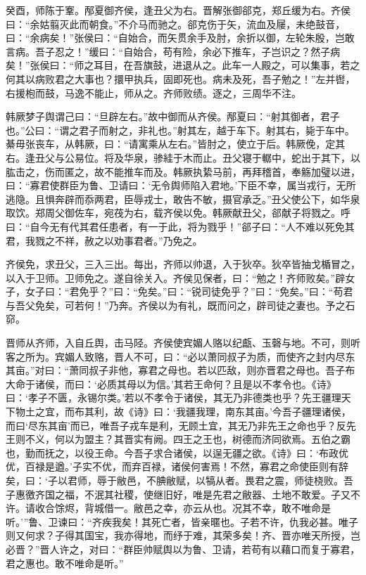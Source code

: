 \documentclass[a4paper,12pt,UTF8,twoside]{ctexbook}
\begin{document}
癸酉，师陈于鞌。邴夏御齐侯，逢丑父为右。晋解张御郤克，郑丘缓为右。齐侯曰：“余姑翦灭此而朝食。”不介马而驰之。郤克伤于矢，流血及屦，未绝鼓音，曰：“余病矣！”张侯曰：“自始合，而矢贯余手及肘，余折以御，左轮朱殷，岂敢言病。吾子忍之！”缓曰：“自始合，苟有险，余必下推车，子岂识之？然子病矣！”张侯曰：“师之耳目，在吾旗鼓，进退从之。此车一人殿之，可以集事，若之何其以病败君之大事也？擐甲执兵，固即死也。病未及死，吾子勉之！”左并辔，右援枹而鼓，马逸不能止，师从之。齐师败绩。逐之，三周华不注。

韩厥梦子舆谓己曰：“旦辟左右。”故中御而从齐侯。邴夏曰：“射其御者，君子也。”公曰：“谓之君子而射之，非礼也。”射其左，越于车下。射其右，毙于车中。綦毋张丧车，从韩厥，曰：“请寓乘从左右。”皆肘之，使立于后。韩厥俛，定其右。逢丑父与公易位。将及华泉，骖絓于木而止。丑父寝于轏中，蛇出于其下，以肱击之，伤而匿之，故不能推车而及。韩厥执絷马前，再拜稽首，奉觞加璧以进，曰：“寡君使群臣为鲁、卫请曰：‘无令舆师陷入君地。’下臣不幸，属当戎行，无所逃隐。且惧奔辟而忝两君，臣辱戎士，敢告不敏，摄官承乏。”丑父使公下，如华泉取饮。郑周父御佐车，宛茷为右，载齐侯以免。韩厥献丑父，郤献子将戮之。呼曰：“自今无有代其君任患者，有一于此，将为戮乎！”郤子曰：“人不难以死免其君，我戮之不祥，赦之以劝事君者。”乃免之。

齐侯免，求丑父，三入三出。每出，齐师以帅退，入于狄卒。狄卒皆抽戈楯冒之，以入于卫师。卫师免之。遂自徐关入。齐侯见保者，曰：“勉之！齐师败矣。”辟女子，女子曰：“君免乎？”曰：“免矣。”曰：“锐司徒免乎？”曰：“免矣。”曰：“苟君与吾父免矣，可若何！”乃奔。齐侯以为有礼，既而问之，辟司徒之妻也。予之石窌。

晋师从齐师，入自丘舆，击马陉。齐侯使宾媚人赂以纪甗、玉磬与地。不可，则听客之所为。宾媚人致赂，晋人不可，曰：“必以萧同叔子为质，而使齐之封内尽东其亩。”对曰：“萧同叔子非他，寡君之母也。若以匹敌，则亦晋君之母也。吾子布大命于诸侯，而曰：‘必质其母以为信。’其若王命何？且是以不孝令也。《诗》曰：‘孝子不匮，永锡尔类。’若以不孝令于诸侯，其无乃非德类也乎？先王疆理天下物土之宜，而布其利，故《诗》曰：‘我疆我理，南东其亩。’今吾子疆理诸侯，而曰‘尽东其亩’而已，唯吾子戎车是利，无顾土宜，其无乃非先王之命也乎？反先王则不义，何以为盟主？其晋实有阙。四王之王也，树德而济同欲焉。五伯之霸也，勤而抚之，以役王命。今吾子求合诸侯，以逞无疆之欲。《诗》曰：‘布政优优，百禄是遒。’子实不优，而弃百禄，诸侯何害焉！不然，寡君之命使臣则有辞矣，曰：‘子以君师，辱于敝邑，不腆敝赋，以犒从者。畏君之震，师徒桡败。吾子惠徼齐国之福，不泯其社稷，使继旧好，唯是先君之敝器、土地不敢爱。子又不许。请收合馀烬，背城借一。敝邑之幸，亦云从也。况其不幸，敢不唯命是听。’”鲁、卫谏曰：“齐疾我矣！其死亡者，皆亲暱也。子若不许，仇我必甚。唯子则又何求？子得其国宝，我亦得地，而纾于难，其荣多矣！齐、晋亦唯天所授，岂必晋？”晋人许之，对曰：“群臣帅赋舆以为鲁、卫请，若苟有以藉口而复于寡君，君之惠也。敢不唯命是听。”
\end{document}
